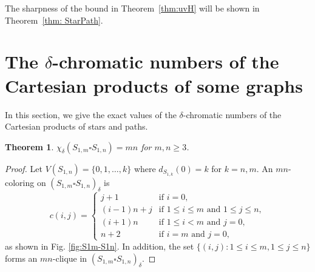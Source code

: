\documentclass[12pt]{amsart}
\newtheorem{theorem}{Theorem}
\newtheorem{remark}[theorem]{Remark}
\DeclarePairedDelimiter{\ceil}{\lceil}{\rceil}
\begin{document}
The sharpness of the bound in Theorem~\ref{thm:uvH} will be shown in Theorem~\ref{thm: StarPath}.

\section{The $\delta$-chromatic numbers of the Cartesian products of some graphs}

In this section, we give the exact values of the $\delta$-chromatic numbers of the Cartesian products of stars and paths.


\begin{theorem}\label{thm: StarStar}
    $\chi_\delta(S_{1,m}\square S_{1,n}) = mn$ for $m,n\geq 3$.
\end{theorem}
\begin{proof}
    Let $V(S_{1,n})=\{0,1,\dots,k\}$ where $d_{S_{1,k}}(0)=k$ for $k=n,m$.
    An $mn$-coloring on $(S_{1,m}\square S_{1,n})_\delta$ is
    \[ c(i,j) =
    \begin{cases}
        j+1         & \text{if } i=0, \\
        (i-1)n + j & \text{if } 1\leq i \leq m \text{ and } 1\leq j \leq n,\\
        (i+1)n     & \text{if } 1\leq i < m \text{ and } j=0, \\
        n+2     & \text{if } i=m \text{ and } j=0,
    \end{cases}\]
    as shown in Fig. \ref{fig:S1m-S1n}.
    In addition, the set $\{(i,j) : 1\leq i \leq m, 1\leq j\leq n\}$ forms an $mn$-clique in $(S_{1,m}\square S_{1,n})_\delta$.
\end{proof}
\end{document}
